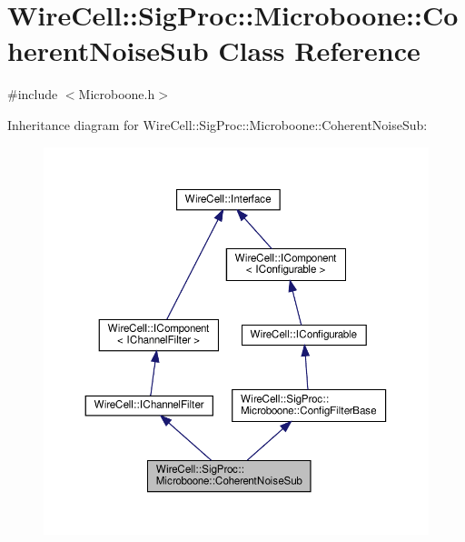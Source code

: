 \hypertarget{class_wire_cell_1_1_sig_proc_1_1_microboone_1_1_coherent_noise_sub}{}\section{Wire\+Cell\+:\+:Sig\+Proc\+:\+:Microboone\+:\+:Coherent\+Noise\+Sub Class Reference}
\label{class_wire_cell_1_1_sig_proc_1_1_microboone_1_1_coherent_noise_sub}


{\ttfamily \#include $<$Microboone.\+h$>$}



Inheritance diagram for Wire\+Cell\+:\+:Sig\+Proc\+:\+:Microboone\+:\+:Coherent\+Noise\+Sub\+:
\nopagebreak
\begin{figure}[H]
\begin{center}
\leavevmode
\includegraphics[width=350pt]{class_wire_cell_1_1_sig_proc_1_1_microboone_1_1_coherent_noise_sub__inherit__graph}
\end{center}
\end{figure}


